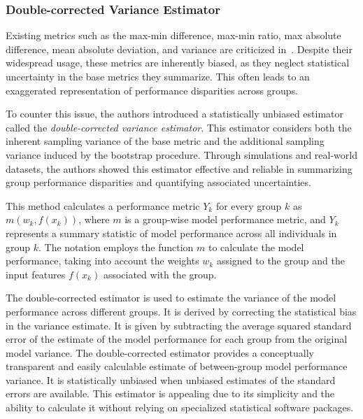 \subsubsection{Double-corrected Variance Estimator}
\label{subsec:intrank_meth_metr_18n}

Existing metrics such as the max-min difference, max-min ratio, max absolute difference, mean absolute deviation, and variance are criticized in~\cite{lum2022biasing}. Despite their widespread usage, these metrics are inherently biased, as they neglect statistical uncertainty in the base metrics they summarize. This often leads to an exaggerated representation of performance disparities across groups.

To counter this issue, the authors introduced a statistically unbiased estimator called the \emph{double-corrected variance estimator}. This estimator considers both the inherent sampling variance of the base metric and the additional sampling variance induced by the bootstrap procedure.
Through simulations and real-world datasets, the authors showed this estimator effective and reliable in summarizing group performance disparities and quantifying associated uncertainties.

This method calculates a performance metric $Y_k$ for every group $k$ as $m(w_k, f(x_k))$, where $m$ is a group-wise model performance metric, and $Y_k$ represents a summary statistic of model performance across all individuals in group $k$.
The notation employs the function $m$ to calculate the model performance, taking into account the weights $w_k$ assigned to the group and the input features $f(x_k)$ associated with the group. 

The double-corrected estimator
is used to estimate the variance of the model performance across different groups. It is derived by correcting the statistical bias in the variance estimate. It is given by subtracting the average squared standard error of the estimate of the model performance for each group
from the original model variance.
The double-corrected estimator provides a conceptually transparent and easily calculable estimate of between-group model performance variance. It is statistically unbiased when unbiased estimates of the standard errors are available. This estimator is appealing due to its simplicity and the ability to calculate it without relying on specialized statistical software packages. 


